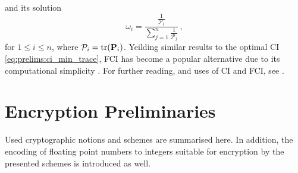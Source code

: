 and its solution
\begin{equation}\label{eq:prelims:fci_solution}
    \omega_i = \frac{\frac{1}{\mathcal{P}_i}}{\sum_{j=1}^n \frac{1}{\mathcal{P}_j}}\,,
\end{equation}
for $1\leq i\leq n$, where $\mathcal{P}_i = \operatorname{tr}({{\mathbf{P}}}_i)$. Yeilding similar results to the optimal CI \eqref{eq:prelims:ci_min_trace}, FCI has become a popular alternative due to its computational simplicity \cite{congOrderInsensitiveSequential2016,frankenImprovedFastCovariance2005,zhangFastCovarianceIntersection2019}. For further reading, and uses of CI and FCI, see \cite{julierNondivergentEstimationAlgorithm1997,niehsenInformationFusionBased2002}.

% 
%                                                                                                      
%                                                                                                      
%                                                                                                      
% 

\section{Encryption Preliminaries}\label{sec:prelims:crypto_prelims}
Used cryptographic notions and schemes are summarised here. In addition, the encoding of floating point numbers to integers suitable for encryption by the presented schemes is introduced as well.

% 
% 


